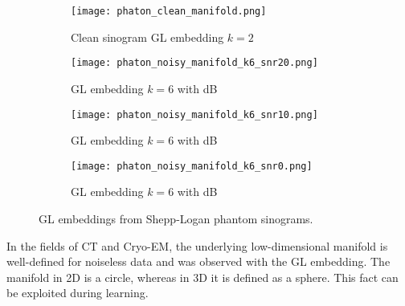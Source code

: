 \begin{figure}[H]
    \captionsetup[subfigure]{justification=centering}
    \centering
    \begin{subfigure}[t]{0.25\textwidth}
        \texttt{[image: phaton\_clean\_manifold.png]}
        \caption{Clean sinogram GL embedding $k=2$}
        \label{fig:clean_manifold}
    \end{subfigure}\hfill
    \begin{subfigure}[t]{0.25\textwidth}
      \texttt{[image: phaton\_noisy\_manifold\_k6\_snr20.png]}
      \caption{GL embedding $k=6$ with  dB}
      \label{fig:noisy_manifold_k6_snr20}
    \end{subfigure}\hfill
    \begin{subfigure}[t]{0.25\textwidth}
      \texttt{[image: phaton\_noisy\_manifold\_k6\_snr10.png]}
      \caption{GL embedding $k=6$ with  dB}
      \label{fig:noisy_manifold_k6_snr10}
    \end{subfigure}\hfill
    \begin{subfigure}[t]{0.25\textwidth}
      \texttt{[image: phaton\_noisy\_manifold\_k6\_snr0.png]}
      \caption{GL embedding $k=6$ with  dB}
      \label{fig:noisy_manifold_k6_snr0}
    \end{subfigure}
    \caption{GL embeddings from Shepp-Logan phantom sinograms.}
    \label{fig:phantom_manifolds}
  \end{figure}

\begin{tcolorbox}[colback=red!5!white,colframe=red!75!black]
    In the fields of CT and Cryo-EM, the underlying low-dimensional manifold is well-defined for noiseless data 
    and was observed with the GL embedding.
    The manifold in 2D is a circle, whereas in 3D it is defined as a sphere.
    This fact can be exploited during learning.
\end{tcolorbox}

